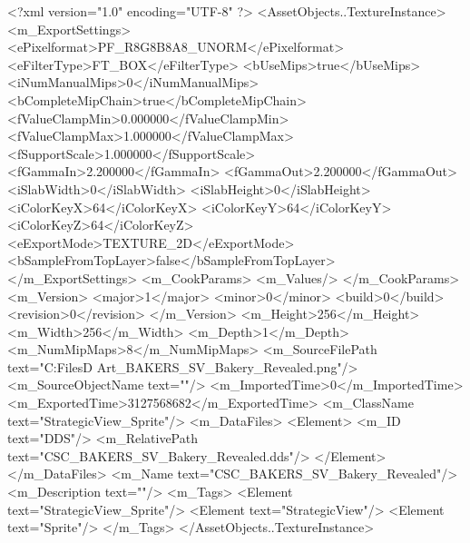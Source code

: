 <?xml version="1.0" encoding="UTF-8" ?>
<AssetObjects..TextureInstance>
	<m_ExportSettings>
		<ePixelformat>PF_R8G8B8A8_UNORM</ePixelformat>
		<eFilterType>FT_BOX</eFilterType>
		<bUseMips>true</bUseMips>
		<iNumManualMips>0</iNumManualMips>
		<bCompleteMipChain>true</bCompleteMipChain>
		<fValueClampMin>0.000000</fValueClampMin>
		<fValueClampMax>1.000000</fValueClampMax>
		<fSupportScale>1.000000</fSupportScale>
		<fGammaIn>2.200000</fGammaIn>
		<fGammaOut>2.200000</fGammaOut>
		<iSlabWidth>0</iSlabWidth>
		<iSlabHeight>0</iSlabHeight>
		<iColorKeyX>64</iColorKeyX>
		<iColorKeyY>64</iColorKeyY>
		<iColorKeyZ>64</iColorKeyZ>
		<eExportMode>TEXTURE_2D</eExportMode>
		<bSampleFromTopLayer>false</bSampleFromTopLayer>
	</m_ExportSettings>
	<m_CookParams>
		<m_Values/>
	</m_CookParams>
	<m_Version>
		<major>1</major>
		<minor>0</minor>
		<build>0</build>
		<revision>0</revision>
	</m_Version>
	<m_Height>256</m_Height>
	<m_Width>256</m_Width>
	<m_Depth>1</m_Depth>
	<m_NumMipMaps>8</m_NumMipMaps>
	<m_SourceFilePath text="C:\Users\Shadow\Desktop\Working Files\2D Art\Quarters\Bakers\StrategicView\CSC_BAKERS_SV_Bakery_Revealed.png"/>
	<m_SourceObjectName text=""/>
	<m_ImportedTime>0</m_ImportedTime>
	<m_ExportedTime>3127568682</m_ExportedTime>
	<m_ClassName text="StrategicView_Sprite"/>
	<m_DataFiles>
		<Element>
			<m_ID text="DDS"/>
			<m_RelativePath text="CSC_BAKERS_SV_Bakery_Revealed.dds"/>
		</Element>
	</m_DataFiles>
	<m_Name text="CSC_BAKERS_SV_Bakery_Revealed"/>
	<m_Description text=""/>
	<m_Tags>
		<Element text="StrategicView_Sprite"/>
		<Element text="StrategicView"/>
		<Element text="Sprite"/>
	</m_Tags>
</AssetObjects..TextureInstance>


